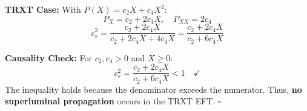 \documentclass[a4paper,12pt]{article}
\begin{document}
\textbf{TRXT Case:}
With $P(X) = c_2 X + c_4 X^2$:
\begin{equation}
    P_X = c_2 + 2c_4 X, \quad P_{XX} = 2c_4
\end{equation}
\begin{equation}
    c_s^2 = \frac{c_2 + 2c_4 X}{c_2 + 2c_4 X + 4c_4 X} = \frac{c_2 + 2c_4 X}{c_2 + 6c_4 X}
\end{equation}

\textbf{Causality Check:}
For $c_2, c_4 > 0$ and $X \geq 0$:
\begin{equation}
    c_s^2 = \frac{c_2 + 2c_4 X}{c_2 + 6c_4 X} < 1 \quad \checkmark
\end{equation}
The inequality holds because the denominator exceeds the numerator. Thus, \textbf{no superluminal propagation} occurs in the TRXT EFT. \hfill $\square$

\end{document}
